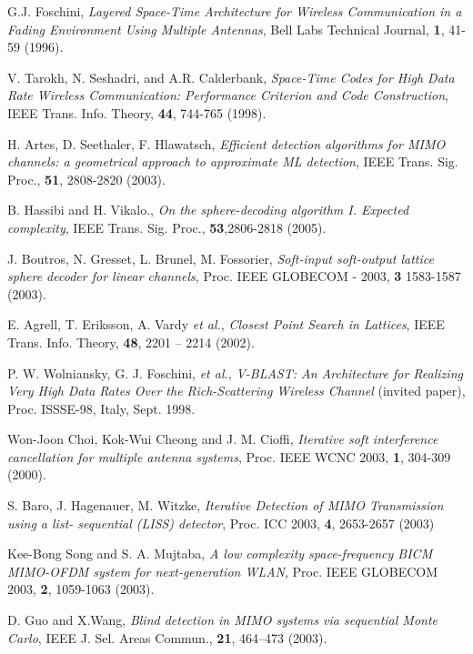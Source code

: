 \documentclass[pre,12pt,aps]{revtex4}
\begin{document}
\begin{thebibliography}{100}
G.J. Foschini, {\it Layered Space-Time Architecture 
for Wireless Communication in a Fading Environment Using Multiple Antennas},
Bell Labs Technical Journal, {\bf 1}, 41-59 (1996).

V. Tarokh, N. Seshadri, and A.R. Calderbank, 
{\it Space-Time Codes for High Data Rate Wireless 
       Communication: Performance Criterion and Code 
Construction}, IEEE Trans. Info.
       Theory, {\bf 44}, 744-765 (1998).

H. Artes, D. Seethaler, F. Hlawatsch, 
{\it Efficient detection algorithms for MIMO channels: a 
        geometrical approach to approximate ML detection}, 
IEEE Trans. Sig. Proc., {\bf 51}, 
       2808-2820  (2003).

B. Hassibi and H. Vikalo., {\it On the sphere-decoding 
algorithm I. Expected complexity}, IEEE
       Trans. Sig. Proc., {\bf 53},2806-2818 (2005).
  
J. Boutros, N. Gresset, L. Brunel, M. Fossorier, 
{\it Soft-input soft-output lattice sphere
       decoder for linear channels}, Proc. 
IEEE GLOBECOM - 2003, {\bf 3} 1583-1587 (2003).

E. Agrell, T. Eriksson, A. Vardy {\it et al.}, 
{\it Closest Point Search in Lattices}, IEEE Trans. 
        Info. Theory, {\bf 48}, 2201 – 2214 (2002).
 
P. W. Wolniansky, G. J. Foschini, {\it et al.}, 
{\it V-BLAST: An Architecture for Realizing Very High
       Data Rates Over the Rich-Scattering Wireless 
Channel} (invited paper), Proc. ISSSE-98, Italy, 
       Sept. 1998.

Won-Joon Choi, Kok-Wui Cheong  and J. M. Cioffi, 
{\it Iterative soft interference cancellation for 
        multiple antenna systems},  
Proc. IEEE WCNC 2003, {\bf 1}, 304-309 (2000).

S. Baro, J. Hagenauer, M. Witzke, 
{\it Iterative Detection of MIMO Transmission using a list-
         sequential (LISS) detector},
Proc. ICC 2003, {\bf 4}, 2653-2657 (2003)
 
Kee-Bong Song  and S. A. Mujtaba, 
{\it A low complexity space-frequency BICM MIMO-OFDM 
         system for next-generation WLAN}, 
Proc. IEEE GLOBECOM 2003, {\bf 2}, 1059-1063
         (2003).  

D. Guo and X.Wang, {\it Blind detection in MIMO 
systems via sequential Monte Carlo}, IEEE J.     
        Sel. Areas Commun., 
{\bf 21}, 464–473 (2003).


\end{thebibliography}
\end{document}
